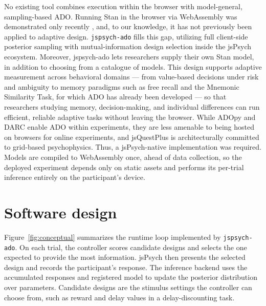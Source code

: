 No existing tool combines execution within the browser with model-general, sampling-based ADO.
Running Stan in the browser via WebAssembly was demonstrated only recently \citep{stanplayground}, and, to our knowledge, it has not previously been applied to adaptive design.
\texttt{jspsych-ado} fills this gap, utilizing full client-side posterior sampling with mutual-information design selection inside the jsPsych ecosystem. 
Moreover, jspsych-ado lets researchers supply their own Stan model, in addition to choosing from a catalogue of models. This design supports adaptive measurement
across behavioral domains --- from value-based decisions under risk and ambiguity \citep{levy2010neural} to memory paradigms such as free recall \citep{manning2023feature} and the Mnemonic Similarity Task, for which ADO has already been developed \citep{villarreal2022adaptive} --- so that researchers studying memory, decision-making,
and individual differences can run efficient, reliable adaptive tasks without leaving the
browser. While ADOpy and DARC enable ADO within experiments, they are less amenable to being hosted on browsers for online experiments, and jsQuestPlus is architecturally committed to grid-based psychophysics. Thus, a jsPsych-native implementation was required. Models are compiled to WebAssembly once, ahead of data collection, so the deployed experiment depends only on static assets and performs its per-trial inference entirely on the participant's device.

\section{Software design}

Figure~\ref{fig:conceptual} summarizes the runtime loop implemented by \texttt{jspsych-ado}. On each trial, the controller scores candidate designs and selects the one expected to provide the most information. jsPsych then presents the selected design and records the participant's response. The inference backend uses the accumulated responses and registered model to update the posterior distribution over parameters. Candidate designs are the stimulus settings the controller can choose from, such as reward and delay values in a delay-discounting task.

